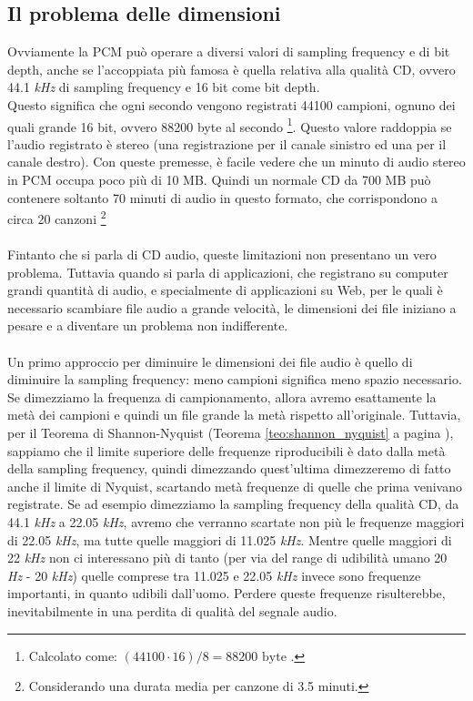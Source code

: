 		\subsection{Il problema delle dimensioni} \label{subsec:dimensioni}
			Ovviamente la PCM può operare a diversi valori di sampling frequency e di bit depth, anche se l'accoppiata più famosa è quella relativa alla qualità CD, ovvero 44.1 \textit{kHz} di sampling frequency e 16 bit come bit depth.\\
			Questo significa che ogni secondo vengono registrati 44100 campioni, ognuno dei quali grande 16 bit, ovvero 88200 byte al secondo \footnote{Calcolato come: $(44100\cdot 16)/8=88200\mbox{ byte }$.}. Questo valore raddoppia se l'audio registrato è stereo (una registrazione per il canale sinistro ed una per il canale destro). Con queste premesse, è facile vedere che un minuto di audio stereo in PCM occupa poco più di 10 MB. Quindi un normale CD da 700 MB può contenere soltanto 70 minuti di audio in questo formato, che corrispondono a circa 20 canzoni \footnote{Considerando una durata media per canzone di 3.5 minuti.}\\
			\\
			Fintanto che si parla di CD audio, queste limitazioni non presentano un vero problema. Tuttavia quando si parla di applicazioni, che registrano su computer grandi quantità di audio, e specialmente di applicazioni su Web, per le quali è necessario scambiare file audio a grande velocità, le dimensioni dei file iniziano a pesare e a diventare un problema non indifferente.\\
			\\
			Un primo approccio per diminuire le dimensioni dei file audio è quello di diminuire la sampling frequency: meno campioni significa meno spazio necessario. Se dimezziamo la frequenza di campionamento, allora avremo esattamente la metà dei campioni e quindi un file grande la metà rispetto all'originale. Tuttavia, per il Teorema di Shannon-Nyquist (Teorema \ref{teo:shannon_nyquist} a pagina \pageref{teo:shannon_nyquist}), sappiamo che il limite superiore delle frequenze riproducibili è dato dalla metà della sampling frequency, quindi dimezzando quest'ultima dimezzeremo di fatto anche il limite di Nyquist, scartando metà frequenze di quelle che prima venivano registrate. Se ad esempio dimezziamo la sampling frequency della qualità CD, da 44.1 \textit{kHz} a 22.05 \textit{kHz}, avremo che verranno scartate non più le frequenze maggiori di 22.05 \textit{kHz}, ma tutte quelle maggiori di 11.025 \textit{kHz}. Mentre quelle maggiori di 22 \textit{kHz} non ci interessano più di tanto (per via del range di udibilità umano 20 \textit{Hz} - 20 \textit{kHz}) quelle comprese tra 11.025 e 22.05 \textit{kHz} invece sono frequenze importanti, in quanto udibili dall'uomo. Perdere queste frequenze risulterebbe, inevitabilmente in una perdita di qualità del segnale audio.\\
